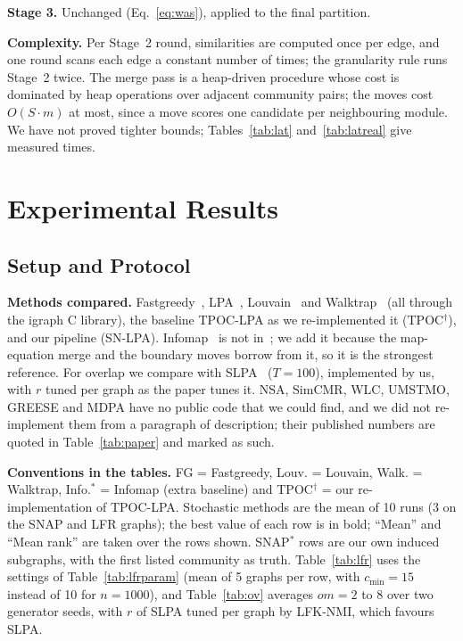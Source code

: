 \documentclass[conference]{IEEEtran}
\begin{document}
\textbf{Stage 3.} Unchanged (Eq.~\eqref{eq:was}), applied to the final partition.



\textbf{Complexity.} Per Stage~2 round, similarities are computed once per edge, and one round scans each edge a constant number of times; the granularity rule runs Stage~2 twice. The merge pass is a heap-driven procedure whose cost is dominated by heap operations over adjacent community pairs; the moves cost $O(S\cdot m)$ at most, since a move scores one candidate per neighbouring module. We have not proved tighter bounds; Tables~\ref{tab:lat} and~\ref{tab:latreal} give measured times.



\section{Experimental Results}\label{sec:results}
\subsection{Setup and Protocol}\label{sec:setup}
\textbf{Methods compared.} Fastgreedy~\cite{clauset2004}, LPA~\cite{raghavan2007}, Louvain~\cite{blondel2008} and Walktrap~\cite{pons2006} (all through the igraph C library), the baseline TPOC-LPA as we re-implemented it (TPOC$^{\dagger}$), and our pipeline (SN-LPA). Infomap~\cite{rosvall2008} is not in~\cite{kong2026}; we add it because the map-equation merge and the boundary moves borrow from it, so it is the strongest reference. For overlap we compare with SLPA~\cite{xie2011} ($T{=}100$), implemented by us, with $r$ tuned per graph as the paper tunes it. NSA, SimCMR, WLC, UMSTMO, GREESE and MDPA have no public code that we could find, and we did not re-implement them from a paragraph of description; their published numbers are quoted in Table~\ref{tab:paper} and marked as such.

\textbf{Conventions in the tables.} FG = Fastgreedy, Louv. = Louvain, Walk. = Walktrap, Info.$^{*}$ = Infomap (extra baseline) and TPOC$^{\dagger}$ = our re-implementation of TPOC-LPA. Stochastic methods are the mean of 10 runs (3 on the SNAP and LFR graphs); the best value of each row is in bold; ``Mean'' and ``Mean rank'' are taken over the rows shown. SNAP$^{*}$ rows are our own induced subgraphs, with the first listed community as truth. Table~\ref{tab:lfr} uses the settings of Table~\ref{tab:lfrparam} (mean of 5 graphs per row, with $c_{\min}{=}15$ instead of 10 for $n{=}1000$), and Table~\ref{tab:ov} averages $om=2$ to 8 over two generator seeds, with $r$ of SLPA tuned per graph by LFK-NMI, which favours SLPA.
\end{document}
